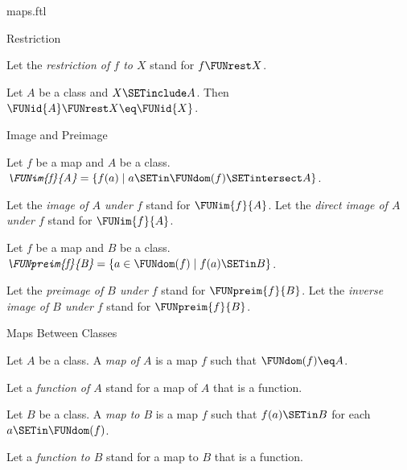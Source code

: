 \documentclass{naproche-library}
\begin{document}
\begin{smodule}[title=Maps]{maps.ftl}
\begin{sfragment}{Restriction}
\begin{definition}[forthel,id=FOUNDATIONS_06_7095412741636096]
    Let the \emph{restriction of $f$ to $X$} stand for $f \FUNrest X$.
  \end{definition}

  \begin{proposition}[forthel,id=FOUNDATIONS_06_2170189258948608]
    Let $A$ be a class and $X \SETinclude A$.
    Then $\FUNid{A} \FUNrest X \eq \FUNid{X}$.
  \end{proposition}
\end{sfragment}

\begin{sfragment}{Image and Preimage}
  \begin{definition}[forthel,id=FOUNDATIONS_06_3038237683613696]
    Let $f$ be a map and $A$ be a class.
    $\emph{\FUNim{f}{A}} = \{ f(a) \mid a \SETin \FUNdom(f) \SETintersect A \}$.

    Let the \emph{image of $A$ under $f$} stand for $\FUNim{f}{A}$.
    Let the \emph{direct image of $A$ under $f$} stand for $\FUNim{f}{A}$.
  \end{definition}

  \begin{definition}[forthel,id=FOUNDATIONS_06_4563167805964288]
    Let $f$ be a map and $B$ be a class.
    $\emph{\FUNpreim{f}{B}} = \{ a \in \FUNdom(f) \mid f(a) \SETin B \}$.

    Let the \emph{preimage of $B$ under $f$} stand for $\FUNpreim{f}{B}$.
    Let the \emph{inverse image of $B$ under $f$} stand for $\FUNpreim{f}{B}$.
  \end{definition}
\end{sfragment}

\begin{sfragment}{Maps Between Classes}

  \begin{definition}[forthel,id=FOUNDATIONS_06_6934038600220672]
    Let $A$ be a class.
    A \emph{map of $A$} is a map $f$ such that $\FUNdom(f) \eq A$.

    Let a \emph{function of $A$} stand for a map of $A$ that is a function.
  \end{definition}

  \begin{definition}[forthel,id=FOUNDATIONS_06_7725375157174272]
    Let $B$ be a class.
    A \emph{map to $B$} is a map $f$ such that $f(a) \SETin B$ for each $a \SETin \FUNdom(f)$.

    Let a \emph{function to $B$} stand for a map to $B$ that is a function.
  \end{definition}


\end{sfragment}
\end{smodule}
\end{document}

